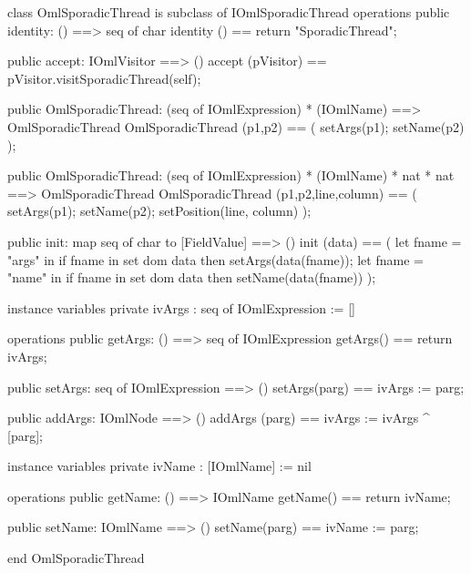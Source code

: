 \begin{vdm_al}
class OmlSporadicThread is subclass of IOmlSporadicThread
operations
  public identity: () ==> seq of char
  identity () == return "SporadicThread";

  public accept: IOmlVisitor ==> ()
  accept (pVisitor) == pVisitor.visitSporadicThread(self);

  public OmlSporadicThread:
    (seq of IOmlExpression) *
    (IOmlName) ==> OmlSporadicThread
  OmlSporadicThread (p1,p2) == 
    ( setArgs(p1);
      setName(p2) );

  public OmlSporadicThread:
    (seq of IOmlExpression) *
    (IOmlName) *
    nat *
    nat ==> OmlSporadicThread
  OmlSporadicThread (p1,p2,line,column) == 
    ( setArgs(p1);
      setName(p2);
      setPosition(line, column) );

  public init: map seq of char to [FieldValue] ==> ()
  init (data) ==
    ( let fname = "args" in
        if fname in set dom data
        then setArgs(data(fname));
      let fname = "name" in
        if fname in set dom data
        then setName(data(fname)) );

instance variables
  private ivArgs : seq of IOmlExpression := []

operations
  public getArgs: () ==> seq of IOmlExpression
  getArgs() == return ivArgs;

  public setArgs: seq of IOmlExpression ==> ()
  setArgs(parg) == ivArgs := parg;

  public addArgs: IOmlNode ==> ()
  addArgs (parg) == ivArgs := ivArgs ^ [parg];

instance variables
  private ivName : [IOmlName] := nil

operations
  public getName: () ==> IOmlName
  getName() == return ivName;

  public setName: IOmlName ==> ()
  setName(parg) == ivName := parg;

end OmlSporadicThread
\end{vdm_al}

